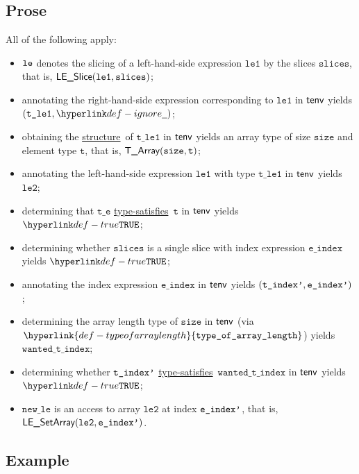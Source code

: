 \documentclass{book}
\newcommand\ProseOrTypeError[0]{\ProseTerminateAs{\TypeErrorConfig}}
\newcommand\structure[0]{\hyperlink{def-structure}{structure}}
\newcommand\typesatisfies[0]{\hyperlink{def-typesatisfies}{type-satisfies}}
\newcommand\typeofarraylength[0]{\hyperlink{def-typeofarraylength}{\texttt{type\_of\_array\_length}}}
\newcommand\vt[0]{\texttt{t}}
\newcommand\vte[0]{\texttt{t\_e}}
\newcommand\vleone[0]{\texttt{le1}}
\newcommand\vletwo[0]{\texttt{le2}}
\newcommand\vtleone[0]{\texttt{t\_le1}}
\newcommand\size[0]{\texttt{size}}
\newcommand\newle[0]{\texttt{new\_le}}
\newcommand\eindex[0]{\texttt{e\_index}}
\newcommand\wantedtindex[0]{\texttt{wanted\_t\_index}}
\newcommand\slices[0]{\texttt{slices}}
\begin{document}
\subsection{Prose}
All of the following apply:
\begin{itemize}
  \item $\texttt{le}$ denotes the slicing of a left-hand-side expression $\vleone$ by the slices $\slices$, that is, $\LESlice(\vleone, \slices)$;
  \item annotating the right-hand-side expression corresponding to $\vleone$ in $\textsf{tenv}$ yields \\ $(\vtleone, \Ignore)$\ProseOrTypeError;
  \item obtaining the \structure\ of $\vtleone$ in $\textsf{tenv}$ yields an array type of size $\size$ and element type $\vt$, that is, $\TArray(\size, \vt)$\ProseOrTypeError;
  \item annotating the left-hand-side expression $\vleone$ with type $\vtleone$ in $\textsf{tenv}$ yields $\vletwo$\ProseOrTypeError;
  \item determining that $\vte$ \typesatisfies\ $\vt$ in $\textsf{tenv}$ yields $\True$\ProseOrTypeError;
  \item determining whether $\slices$ is a single slice with index expression $\eindex$ yields $\True$\ProseOrTypeError;
  \item annotating the index expression $\eindex$ in $\textsf{tenv}$ yields $(\texttt{t\_index'}, \texttt{e\_index'})$\ProseOrTypeError;
  \item determining the array length type of $\size$ in $\textsf{tenv}$ (via $\typeofarraylength$) yields $\wantedtindex$;
  \item determining whether $\texttt{t\_index'}$ \typesatisfies\ $\wantedtindex$ in $\textsf{tenv}$ yields \\
        $\True$\ProseOrTypeError;
  \item $\newle$ is an access to array $\vletwo$ at index $\texttt{e\_index'}$, that is, \\ $\LESetArray(\vletwo, \eindexp)$.
\end{itemize}

\subsection{Example}

\end{document}
